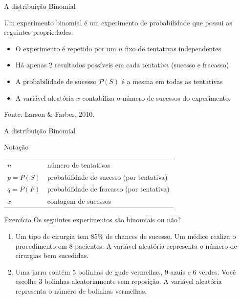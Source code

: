 \documentclass{beamer}
\begin{document}
\begin{frame}{A distribuição Binomial}
  \begin{definition}
    Um \alert{experimento binomial} é um experimento de probabilidade que possui as seguintes propriedades:

    \begin{itemize}
    \item O experimento é repetido por um $n$ fixo de tentativas independentes
    \item Há apenas 2 resultados possíveis em cada tentativa (sucesso e fracasso)
    \item A probabilidade de sucesso $P(S)$ é a mesma em todas as tentativas
    \item A variável aleatória $x$ contabiliza o número de sucessos do experimento.
    \end{itemize}
  \end{definition}

Fonte: Larson \& Farber, 2010.
\end{frame}

\begin{frame}{A distribuição Binomial}
  \begin{block}{Notação}
    \begin{tabular}{ll}
      $n$& número de tentativas \\
$p = P(S)$ & probabilidade de sucesso (por tentativa)\\
$q = P(F)$ & probabilidade de fracasso (por tentativa)\\
$x$ & contagem de sucessos\\
    \end{tabular}
  \end{block}
\end{frame}

\begin{frame}{Exercício}
Os seguintes experimentos são binomiais ou não?
  \begin{block}{}
    \begin{enumerate}
    \item Um tipo de cirurgia tem 85\% de chances de sucesso.
      Um médico realiza o procedimento em 8 pacientes.
      A variável aleatória representa o número de cirurgias bem sucedidas.
    \item Uma jarra contém 5 bolinhas de gude vermelhas, 9 azuis e 6 verdes.
      Você escolhe 3 bolinhas aleatoriamente sem reposição.
      A variável aleatória representa o número de bolinhas vermelhas.
    \end{enumerate}
  \end{block}
\end{frame}
\end{document}
